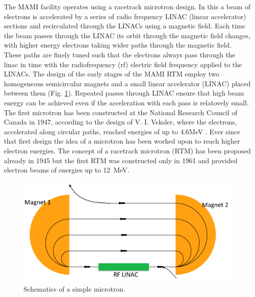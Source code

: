 \indent The MAMI facility operates using a racetrack microtron design.  In this a beam of electrons is accelerated by a series of radio frequency LINAC (linear accelerator) sections and recirculated through the LINACs using a magnetic field. Each time the beam passes through the LINAC its orbit through the magnetic field changes, with higher energy electrons taking wider paths through the magnetic field. These paths are finely tuned such that the electrons always pass through the linac in time with the radiofrequency (rf) electric field frequency applied to the LINACs.  The design of the early stages of the MAMI RTM employ two homogeneous semicircular magnets and a small linear accelerator (LINAC) placed between them (Fig. \ref{microtronplot}).
Repeated passes through LINAC ensure that high beam energy can be achieved even if the acceleration with each pass is relatovely small. The first microtron has been constructed at the National Research Council of Canada in 1947, according to the design of V. I. Veksler, where the electrons, accelerated along circular paths, reached energies of up to 4.6MeV \cite{dehn}. Ever since that first design the idea of a microtron has been worked upon to reach higher electron energies. The concept of a  racetrack microtron (RTM) has been proposed already in 1945 but the first RTM was constructed only in 1961 and provided electron beams of energies up to 12~MeV. 
\begin{figure}[H]
\begin{center}
\includegraphics[scale=0.55]{pictures/png/rfm.png}
\caption{Schematics of a simple microtron.}
\label{microtronplot}
\end{center}
\end{figure}

